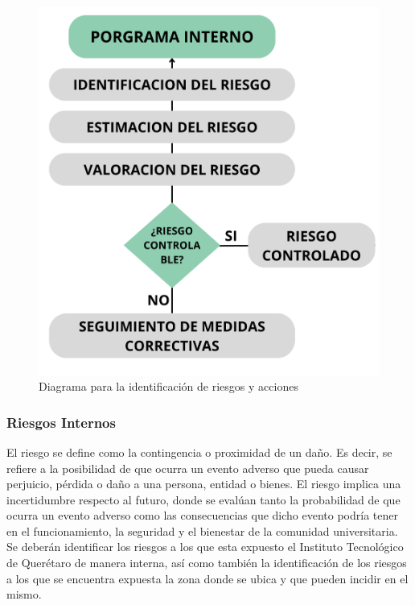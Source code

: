     \begin{figure}[H]
        \centering
        \includegraphics[scale=0.15]{34/img/diagrama.png}
        \caption{Diagrama para la identificación de riesgos y acciones}
    \end{figure}
    
    \subsubsection{ Riesgos Internos}
    El riesgo se define como la contingencia o proximidad de un daño.\cite{RAE} Es decir, se refiere a la posibilidad de que ocurra un evento adverso que pueda causar perjuicio, pérdida o daño a una persona, entidad o bienes. El riesgo implica una incertidumbre respecto al futuro, donde se evalúan tanto la probabilidad de que ocurra un evento adverso como las consecuencias que dicho evento podría tener en el funcionamiento, la seguridad y el bienestar de la comunidad universitaria.
    Se deberán identificar los riesgos a los que esta expuesto el Instituto Tecnológico de Querétaro de manera interna, así como también la identificación de los riesgos a los que se encuentra expuesta la zona donde se ubica y que pueden incidir en el mismo.
    
